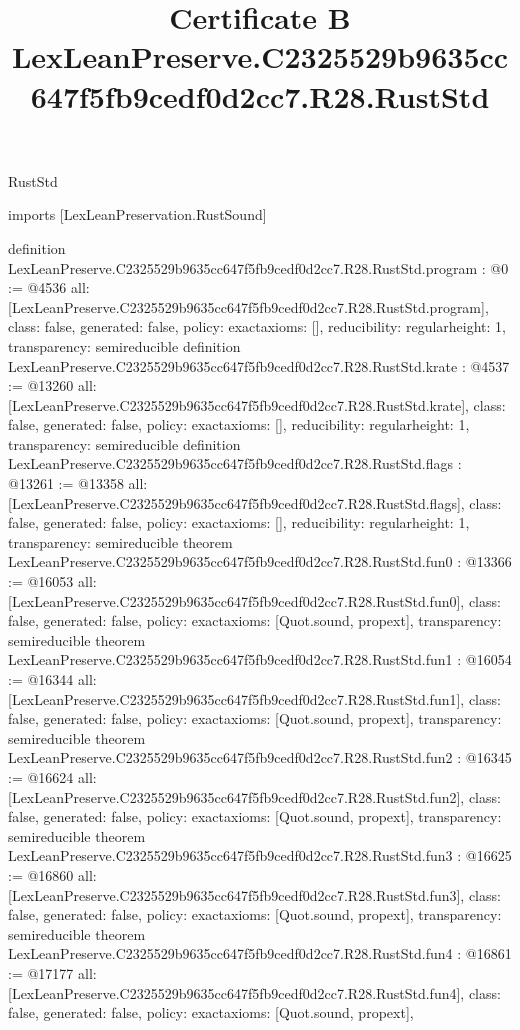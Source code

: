 \begin{lexlean}{RustStd}
\title{Certificate B LexLeanPreserve.C2325529b9635cc647f5fb9cedf0d2cc7.R28.RustStd}
\begin{coremodule}
imports [LexLeanPreservation.RustSound]

definition LexLeanPreserve.C2325529b9635cc647f5fb9cedf0d2cc7.R28.RustStd.program : @0 := @4536 {
  all: [LexLeanPreserve.C2325529b9635cc647f5fb9cedf0d2cc7.R28.RustStd.program],
  class: false,
  generated: false,
  policy: exact{axioms: []},
  reducibility: regular{height: 1},
  transparency: semireducible
}
definition LexLeanPreserve.C2325529b9635cc647f5fb9cedf0d2cc7.R28.RustStd.krate : @4537 := @13260 {
  all: [LexLeanPreserve.C2325529b9635cc647f5fb9cedf0d2cc7.R28.RustStd.krate],
  class: false,
  generated: false,
  policy: exact{axioms: []},
  reducibility: regular{height: 1},
  transparency: semireducible
}
definition LexLeanPreserve.C2325529b9635cc647f5fb9cedf0d2cc7.R28.RustStd.flags : @13261 := @13358 {
  all: [LexLeanPreserve.C2325529b9635cc647f5fb9cedf0d2cc7.R28.RustStd.flags],
  class: false,
  generated: false,
  policy: exact{axioms: []},
  reducibility: regular{height: 1},
  transparency: semireducible
}
theorem LexLeanPreserve.C2325529b9635cc647f5fb9cedf0d2cc7.R28.RustStd.fun0 : @13366 := @16053 {
  all: [LexLeanPreserve.C2325529b9635cc647f5fb9cedf0d2cc7.R28.RustStd.fun0],
  class: false,
  generated: false,
  policy: exact{axioms: [Quot.sound, propext]},
  transparency: semireducible
}
theorem LexLeanPreserve.C2325529b9635cc647f5fb9cedf0d2cc7.R28.RustStd.fun1 : @16054 := @16344 {
  all: [LexLeanPreserve.C2325529b9635cc647f5fb9cedf0d2cc7.R28.RustStd.fun1],
  class: false,
  generated: false,
  policy: exact{axioms: [Quot.sound, propext]},
  transparency: semireducible
}
theorem LexLeanPreserve.C2325529b9635cc647f5fb9cedf0d2cc7.R28.RustStd.fun2 : @16345 := @16624 {
  all: [LexLeanPreserve.C2325529b9635cc647f5fb9cedf0d2cc7.R28.RustStd.fun2],
  class: false,
  generated: false,
  policy: exact{axioms: [Quot.sound, propext]},
  transparency: semireducible
}
theorem LexLeanPreserve.C2325529b9635cc647f5fb9cedf0d2cc7.R28.RustStd.fun3 : @16625 := @16860 {
  all: [LexLeanPreserve.C2325529b9635cc647f5fb9cedf0d2cc7.R28.RustStd.fun3],
  class: false,
  generated: false,
  policy: exact{axioms: [Quot.sound, propext]},
  transparency: semireducible
}
theorem LexLeanPreserve.C2325529b9635cc647f5fb9cedf0d2cc7.R28.RustStd.fun4 : @16861 := @17177 {
  all: [LexLeanPreserve.C2325529b9635cc647f5fb9cedf0d2cc7.R28.RustStd.fun4],
  class: false,
  generated: false,
  policy: exact{axioms: [Quot.sound, propext]},
}
\end{coremodule}
\end{lexlean}
